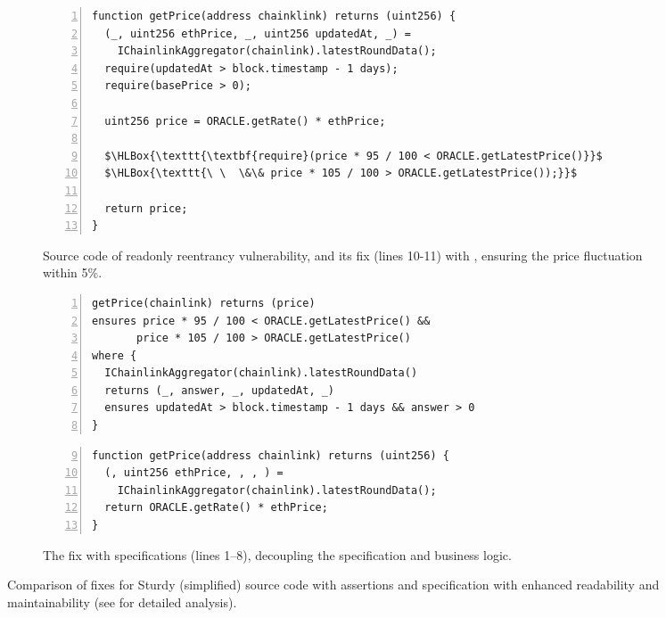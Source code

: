 
\begin{figure*}[t]
\begin{subfigure}[t]{0.49\textwidth}
\begin{lstlisting}[numbers=left,stepnumber=1,xleftmargin=1em,numberstyle=\ttfamily\color{gray},numbersep=3pt]
function getPrice(address chainklink) returns (uint256) {
  (_, uint256 ethPrice, _, uint256 updatedAt, _) = 
    IChainlinkAggregator(chainlink).latestRoundData();
  require(updatedAt > block.timestamp - 1 days);
  require(basePrice > 0);
  
  uint256 price = ORACLE.getRate() * ethPrice;
  
  $\HLBox{\texttt{\textbf{require}(price * 95 / 100 < ORACLE.getLatestPrice()}}$
  $\HLBox{\texttt{\ \  \&\& price * 105 / 100 > ORACLE.getLatestPrice());}}$
  
  return price;
}
\end{lstlisting}
\caption{Source code of readonly reentrancy vulnerability, and its fix (lines 10-11) 
with , ensuring the price fluctuation within 5\%.}
\label{fig:sturby_buggy}
\end{subfigure}%
\hfill
\begin{subfigure}[t]{0.49\textwidth}

\begin{lstlisting}[language=Consol,numbers=left,stepnumber=1,xleftmargin=0.8em,numberstyle=\ttfamily\color{gray},numbersep=3pt,firstnumber=1]
getPrice(chainlink) returns (price)
ensures price * 95 / 100 < ORACLE.getLatestPrice() &&
       price * 105 / 100 > ORACLE.getLatestPrice()
where {
  IChainlinkAggregator(chainlink).latestRoundData()
  returns (_, answer, _, updatedAt, _)
  ensures updatedAt > block.timestamp - 1 days && answer > 0
}
\end{lstlisting}
\vspace{-0.25em}
\begin{lstlisting}[numbers=left,stepnumber=1,xleftmargin=1em,numberstyle=\ttfamily\color{gray},numbersep=3pt,firstnumber=9]
function getPrice(address chainlink) returns (uint256) {
  (, uint256 ethPrice, , , ) = 
    IChainlinkAggregator(chainlink).latestRoundData();
  return ORACLE.getRate() * ethPrice;
}
\end{lstlisting}
\caption{The fix with \lang specifications (lines 1--8), decoupling the specification and business logic.}
\label{fig:sturby_fix}
\end{subfigure}
\caption{Comparison of fixes for Sturdy (simplified) source code with assertions 
and \lang specification with enhanced readability and maintainability (see  for detailed analysis).}
\label{fig:sturbyIntro}
\end{figure*}
